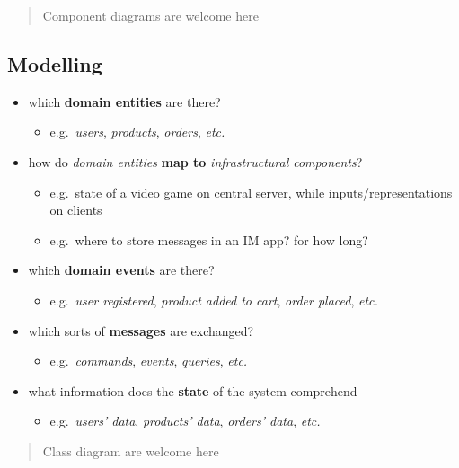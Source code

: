 \documentclass{scrartcl}
\begin{document}
\begin{quote}
Component diagrams are welcome here
\end{quote}

\subsection{Modelling}\label{modelling}

\begin{itemize}
  \item which \textbf{domain entities} are there?
  \begin{itemize}
    \item e.g.~\emph{users}, \emph{products}, \emph{orders}, \emph{etc.}
  \end{itemize}
  
  \item how do \emph{domain entities} \textbf{map to} \emph{infrastructural components}?
  \begin{itemize}
    \item e.g.~state of a video game on central server, while inputs/representations on clients
    \item e.g.~where to store messages in an IM app? for how long?
  \end{itemize}

  \item which \textbf{domain events} are there?
  \begin{itemize}
    \item e.g.~\emph{user registered}, \emph{product added to cart}, \emph{order placed}, \emph{etc.}
  \end{itemize}
  
  \item which sorts of \textbf{messages} are exchanged?
  \begin{itemize}
    \item e.g.~\emph{commands}, \emph{events}, \emph{queries}, \emph{etc.}
  \end{itemize}

  \item what information does the \textbf{state} of the system comprehend
  \begin{itemize}
    \item e.g.~\emph{users' data}, \emph{products' data}, \emph{orders' data},
    \emph{etc.}
  \end{itemize}
\end{itemize}

\begin{quote}
Class diagram are welcome here
\end{quote}
\end{document}
